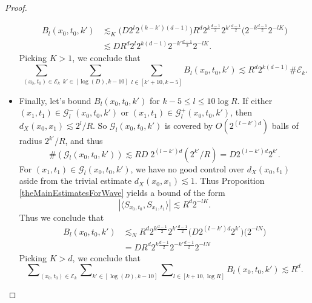 \begin{proof}
\begin{itemize}
\begin{equation}
    \begin{split}
        B_l(x_0,t_0,k') &\lesssim_K \Big( D 2^{l} 2^{(k-k')(d-1)} \Big)  R^{d} 2^{k \frac{d-1}{2}} 2^{k' \frac{d-1}{2}} \Big( 2^{-k \frac{d-1}{2}} 2^{-lK} \Big)\\
        &\lesssim D R^d 2^l 2^{k(d-1)} 2^{-k' \frac{d-1}{2}} 2^{-lK}.
    \end{split}
    \end{equation}
    Picking $K > 1$, we conclude that
    \begin{equation} \label{AAAlBoundSmall}
        \sum_{(x_0,t_0) \in \mathcal{E}_k} \sum_{k' \in [\log(D), k - 10]} \sum_{l \in [k' + 10, k - 5]} B_l(x_0,t_0,k') \lesssim R^{d} 2^{k (d-1)} \# \mathcal{E}_k.
    \end{equation}

    \item Finally, let's bound $B_l(x_0,t_0,k')$ for $k - 5 \leq l \leq 10 \log R$. If either $(x_1,t_1) \in \mathcal{G}_l^-(x_0,t_0,k')$ or $(x_1,t_1) \in \mathcal{G}_l^+(x_0,t_0,k')$, then $d_X(x_0,x_1) \lesssim 2^l / R$. So $\mathcal{G}_l(x_0,t_0,k')$ is covered by $O( 2^{(l-k')d} )$ balls of radius $2^{k'} / R$, and thus
    \begin{equation}
        \#(\mathcal{G}_l(x_0,t_0,k')) \lesssim R D\; 2^{(l-k')d} (2^{k'} / R) = D 2^{(l-k')d} 2^{k'}.
    \end{equation}
    For $(x_1,t_1) \in \mathcal{G}_l(x_0,t_0,k')$, we have no good control over $d_X(x_0,t_1)$ aside from the trivial estimate $d_X(x_0,x_1) \lesssim 1$. Thus Proposition \ref{theMainEstimatesForWave} yields a bound of the form
    \begin{equation}
        |\langle {S\!}_{x_0,t_0}, {S\!}_{x_1,t_1} \rangle| \lesssim R^d 2^{-lK}.
    \end{equation}
    Thus we conclude that
    \begin{equation}
    \begin{split}
        B_l(x_0,t_0,k') &\lesssim_N R^{d} 2^{k \frac{d-1}{2}} 2^{k' \frac{d-1}{2}} \Big( D 2^{(l-k')d} 2^{k'} \Big) \Big( 2^{-lN} \Big)\\
        &= D R^d 2^{k \frac{d-1}{2}} 2^{-k' \frac{d-1}{2}} 2^{-lN}
    \end{split}
    \end{equation}
    Picking $K > d$, we conclude that
    \begin{equation} \label{AAAlBoundBig}
        \sum\nolimits_{(x_0,t_0) \in \mathcal{E}_k} \sum\nolimits_{k' \in [\log(D), k - 10]} \sum\nolimits_{l \in [k+10,\log R]} B_l(x_0,t_0,k')  \lesssim R^d.

\end{equation}
\end{itemize}
\end{proof}

